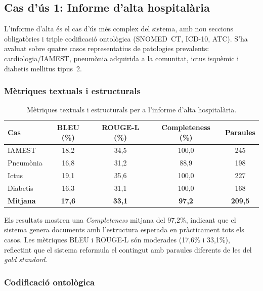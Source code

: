 \documentclass[CAT]{TFUOC}%
\begin{document}
\subsection{Cas d'ús 1: Informe d'alta hospitalària}

L'informe d'alta és el cas d'ús més complex del sistema, amb nou seccions obligatòries i triple codificació ontològica (SNOMED~CT, ICD-10, ATC). S'ha avaluat sobre quatre casos representatius de patologies prevalents: cardiologia/IAMEST, pneumònia adquirida a la comunitat, ictus isquèmic i diabetis mellitus tipus~2.

\subsubsection{Mètriques textuals i estructurals}

\begin{table}[H]
\centering
\small
\begin{tabular}{lcccc}
\hline
\textbf{Cas} & \textbf{BLEU (\%)} & \textbf{ROUGE-L (\%)} & \textbf{Completeness (\%)} & \textbf{Paraules} \\
\hline
IAMEST & 18,2 & 34,5 & 100,0 & 245 \\
Pneumònia & 16,8 & 31,2 & 88,9 & 198 \\
Ictus & 19,1 & 35,6 & 100,0 & 227 \\
Diabetis & 16,3 & 31,1 & 100,0 & 168 \\
\hline
\textbf{Mitjana} & \textbf{17,6} & \textbf{33,1} & \textbf{97,2} & \textbf{209,5} \\
\hline
\end{tabular}
\caption{Mètriques textuals i estructurals per a l'informe d'alta hospitalària.}
\label{tab:discharge-textual}
\end{table}

Els resultats mostren una \textit{Completeness} mitjana del 97,2\%, indicant que el sistema genera documents amb l'estructura esperada en pràcticament tots els casos. Les mètriques BLEU i ROUGE-L són moderades (17,6\% i 33,1\%), reflectint que el sistema reformula el contingut amb paraules diferents de les del \textit{gold standard}.

\subsubsection{Codificació ontològica}
\end{document}
